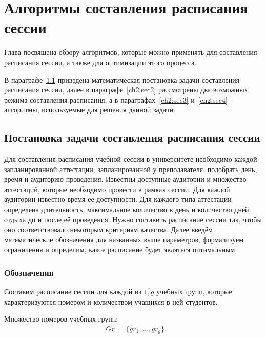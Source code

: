 \chapter{Алгоритмы составления расписания сессии} \label{ch2}
Глава посвящена обзору алгоритмов, которые можно применять для составления расписания сессии, а также для оптимизации этого процесса. 

В параграфе~\ref{ch2:sec1} приведена математическая постановка задачи составления расписания сессии, далее в параграфе~\ref{ch2:sec2} рассмотрены два возможных режима составления расписания, а в параграфах~\ref{ch2:sec3} и~\ref{ch2:sec4} - алгоритмы, используемые для решения данной задачи. 

\section{Постановка задачи составления расписания сессии} \label{ch2:sec1} 

Для составления расписания учебной сессии в университете необходимо каждой запланированной аттестации, запланированной у преподавателя, подобрать день, время и аудиторию проведения. 
Известны доступные аудитории и множество аттестаций, которые необходимо провести в рамках сессии. Для каждой аудитории известно время ее доступности. Для каждого типа аттестации определена длительность, максимальное количество в день и количество дней отдыха до и после её проведения. Нужно составить расписание сессии так, чтобы оно соответствовало некоторым критериям качества.
Далее введём математические обозначения для названных выше параметров, формализуем ограничения и определим, какое расписание будет являться оптимальным.


\subsection{Обозначения} 

Составим расписание сессии для каждой из $\overline{1,g}$ учебных групп, которые характеризуются номером и количеством учащихся в ней студентов. 

Множество номеров учебных групп: 
\begin{align}
	& Gr\ =  \{ gr_1,...,gr_g \}.
\end{align}


